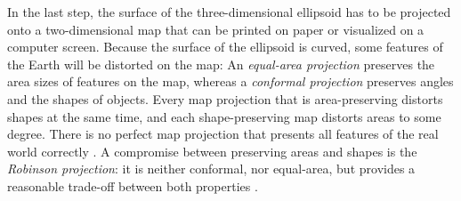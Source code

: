 In the last step, the surface of the three-dimensional ellipsoid has to be projected onto a two-dimensional map that can be printed on paper or visualized on a computer screen.
Because the surface of the ellipsoid is curved, some features of the Earth will be distorted on the map: An \emph{equal-area projection} preserves the area sizes of features on the map, whereas a \emph{conformal projection} preserves angles and the shapes of objects. Every map projection that is area-preserving distorts shapes at the same time, and each shape-preserving map distorts areas to some degree. There is no perfect map projection that presents all features of the real world correctly \cite{mapProjectionGeokov}.
A compromise between preserving areas and shapes is the \emph{Robinson projection}: it is neither conformal, nor equal-area, but provides a reasonable trade-off between both properties \cite{robinson}.


